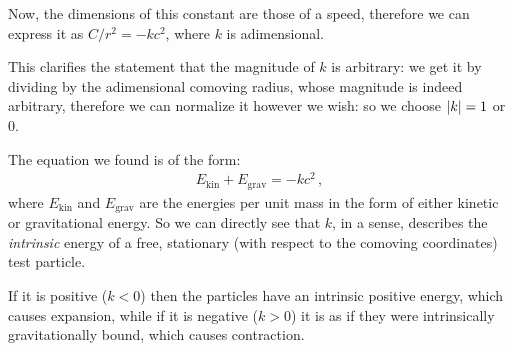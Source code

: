 \documentclass[main.tex]{subfiles}
\begin{document}
Now, the dimensions of this constant are those of a speed, therefore we can express it as \(C / r^2 = -k c^2\), where \(k\) is adimensional.

This clarifies the statement that the magnitude of \(k\) is arbitrary: we get it by dividing by the adimensional comoving radius, whose magnitude is indeed arbitrary, therefore we can normalize it however we wish: so we choose \(\abs{k} = 1\) or 0.

\begin{bluebox}
The equation we found is of the form: 
%
\begin{align}
E _{\text{kin}} + E _{\text{grav}} = -k c^2
\,,
\end{align}
%
where \(E _{\text{kin}}\) and \(E _{\text{grav}}\) are the energies per unit mass in the form of either kinetic or gravitational energy.
So we can directly see that \(k\), in a sense, describes the \emph{intrinsic} energy of a free, stationary (with respect to the comoving coordinates) test particle.

If it is positive (\(k<0\)) then the particles have an intrinsic positive energy, which causes expansion, while if it is negative (\(k>0\)) it is as if they were intrinsically gravitationally bound, which causes contraction.
\end{bluebox}

\end{document}
